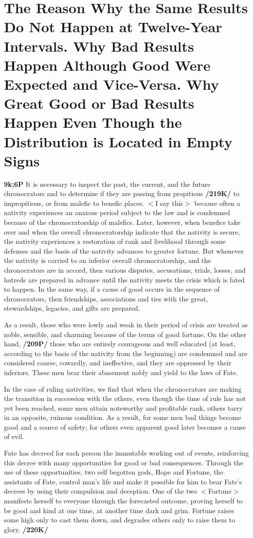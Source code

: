 \section{The Reason Why the Same Results Do Not Happen at Twelve-Year Intervals. Why Bad Results Happen Although Good Were Expected and Vice-Versa. Why Great Good or Bad Results Happen Even Though the Distribution is Located in Empty Signs}

\textbf{9k;6P} It is necessary to inspect the past, the current, and the future chronocrators and to determine if they are passing from propitious \textbf{/219K/} to impropitious, or from malefic to benefic places. $<$I say this$>$ because often a nativity experiences an anxious period subject to the law and is condemned because of the
chronocratorship of malefics. Later, however, when benefics take over and when the overall chronocratorship indicate that the nativity is secure, the nativity experiences a restoration of rank and livelihood
through some defenses and the basis of the nativity advances to greater fortune. But whenever the nativity is carried to an inferior overall chronocratorship, and the chronocrators are in accord, then various disputes, accusations, trials, losses, and hatreds are prepared in advance until the nativity meets the crisis which is fated to happen. 
In the same way, if a cause of good occurs in the sequence of chronocrators, then friendships, associations and ties with the great, stewardships, legacies, and gifts are prepared.

As a result, those who were lowly and weak in their period of crisis are treated as noble, sensible, and charming because of the terms of good fortune. On the other hand, \textbf{/209P/} those who are entirely
courageous and well educated (at least, according to the basis of the nativity from the beginning) are condemned and are considered coarse, cowardly, and ineffective, and they are oppressed by their inferiors. These men bear their abasement nobly and yield to the laws of Fate. 

In the case of ruling nativities, we find that when the chronocrators are making the transition in succession with the others, even though the time of rule has not yet been reached, some men attain noteworthy and profitable rank, others tarry in an opposite, ruinous condition. As a result, for some men bad things become good and a source of safety; for others even apparent good later becomes a cause of evil.

Fate has decreed for each person the immutable working out of events, reinforcing this decree with many opportunities for good or bad consequences. Through the use of these opportunities, two self begotten gods, Hope and Fortune, the assistants of Fate, control man’s life and make it possible for him to bear Fate’s decrees by using their compulsion and deception. One of the two $<$Fortune$>$ manifests herself to everyone through the forecasted outcome, proving herself to be good and kind at one time, at another time dark and grim. Fortune raises some high only to cast them down, and degrades others only to raise them to glory. \textbf{/220K/} 

